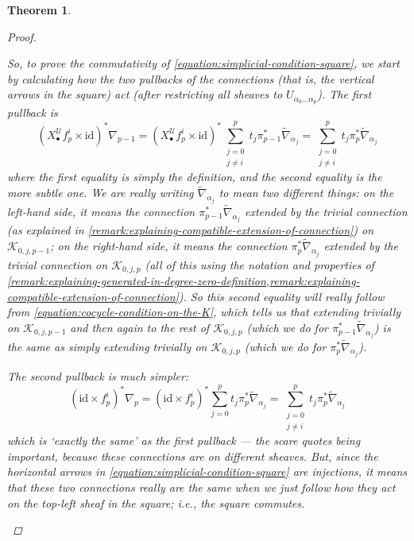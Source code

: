 \documentclass[11pt,fleqn]{article}
\theoremstyle{plain}
\newtheorem{theorem}{Theorem}[subsection]
\theoremstyle{definition}
\theoremstyle{remark}
\numberwithin{equation}{theorem}
\newcommand{\cover}{\mathcal{U}}
\newcommand{\id}{\mathrm{id}}
\newcommand{\nerve}[1]{X_{#1}^\cover}
\begin{document}
\begin{theorem}
\begin{proof}
\begin{enumerate}
                        So, to prove the commutativity of \cref{equation:simplicial-condition-square}, we start by calculating how the two pullbacks of the connections (that is, the vertical arrows in the square) act (after restricting all sheaves to $U_{\alpha_0\ldots\alpha_p}$).
                        The first pullback is
                        \begin{equation*}
                            \left(\nerve{\bullet}f_p^i\times\id\right)^*\nabla_{p-1}
                            =
                            \left(\nerve{\bullet}f_p^i\times\id\right)^* \sum_{\substack{j=0\\j\neq i}}^p t_j\pi_{p-1}^*\widetilde{\nabla}_{\alpha_j}
                            =
                            \sum_{\substack{j=0\\j\neq i}}^p t_j\pi_{p}^*\widetilde{\nabla}_{\alpha_j}
                        \end{equation*}
                        where the first equality is simply the definition, and the second equality is the more subtle one.
                        We are really writing $\widetilde{\nabla}_{\alpha_j}$ to mean two different things: on the left-hand side, it means the connection $\pi_{p-1}^*\widetilde{\nabla}_{\alpha_j}$ extended by the trivial connection (as explained in \cref{remark:explaining-compatible-extension-of-connection}) on $\mathcal{K}_{0,j,p-1}$; on the right-hand side, it means the connection $\pi_p^*\widetilde{\nabla}_{\alpha_j}$ extended by the trivial connection on $\mathcal{K}_{0,j,p}$ (all of this using the notation and properties of \cref{remark:explaining-generated-in-degree-zero-definition,remark:explaining-compatible-extension-of-connection}).
                        So this second equality will really follow from \cref{equation:cocycle-condition-on-the-K}, which tells us that extending trivially on $\mathcal{K}_{0,j,p-1}$ and then again to the rest of $\mathcal{K}_{0,j,p}$ (which we do for $\pi_{p-1}^*\widetilde{\nabla}_{\alpha_j}$) is the same as simply extending trivially on $\mathcal{K}_{0,j,p}$ (which we do for $\pi_{p}^*\widetilde{\nabla}_{\alpha_j}$).

                        The second pullback is much simpler:
                        \begin{equation*}
                            \left(\id\times f_p^i\right)^* \nabla_p
                            =
                            \left(\id\times f_p^i\right)^* \sum_{j=0}^p t_j\pi_p^*\widetilde{\nabla}_{\alpha_j}
                            =
                            \sum_{\substack{j=0\\j\neq i}}^p t_j\pi_p^*\widetilde{\nabla}_{\alpha_j}
                        \end{equation*}
                        which is `exactly the same' as the first pullback --- the scare quotes being important, because these connections are on \emph{different sheaves}.
                        But, since the horizontal arrows in \cref{equation:simplicial-condition-square} are injections, it means that these two connections really are the same when we just follow how they act on the top-left sheaf in the square; i.e., the square commutes.


\end{enumerate}
\end{proof}
\end{theorem}
\end{document}
